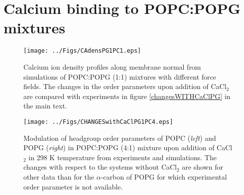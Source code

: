 \documentclass[journal=jpcbfk]{achemso}
\begin{document}
%






\clearpage
\section{Calcium binding to POPC:POPG mixtures}

\begin{figure}[]
  \centering
  \texttt{[image: ../Figs/CAdensPG1PC1.eps]}
  \caption{\label{CAdensPG}
    Calcium ion density profiles along membrane normal from simulations of POPC:POPG (1:1) mixtures with different force fields.
    The changes in the order parameters upon addition of CaCl$_2$ are compared with experiments in figure \ref{changesWITHCaClPG} in the main text.
  }
\end{figure}

\begin{figure*}[]
  \centering
  \texttt{[image: ../Figs/CHANGESwithCaClPG1PC4.eps]}
  \caption{\label{changesWITHCaClPG1PC4}
    Modulation of headgroup order parameters of POPC ({\it left}) and POPG ({\it right}) in POPC:POPG (4:1)
    mixture upon addition of CaCl$_2$ in 298 K temperature from experiments \cite{macdonald87} and simulations.
    The changes with respect to the systems without CaCl$_2$ are shown for other data than
    for the $\alpha$-carbon of POPG for which experimental order parameter is not available.
  }
\end{figure*}
\end{document}
